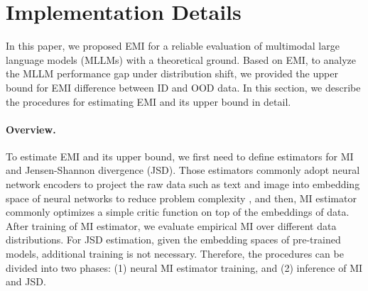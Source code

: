 \section{Implementation Details}\label{appendix:implementation_details}
In this paper, we proposed EMI for a reliable evaluation of multimodal large language models (MLLMs) with a theoretical ground. Based on EMI, to analyze the MLLM performance gap under distribution shift, we provided the upper bound for EMI difference between ID and OOD data. In this section, we describe the procedures for estimating EMI and its upper bound in detail. 

\paragraph{Overview.} To estimate EMI and its upper bound, we first need to define estimators for MI and Jensen-Shannon divergence (JSD). Those estimators commonly adopt neural network encoders to project the raw data such as text and image into embedding space of neural networks to reduce problem complexity \cite{oord2018representation, liu2020learning}, and then, MI estimator commonly optimizes a simple critic function \cite{poole2019variational} on top of the embeddings of data. After training of MI estimator, we evaluate empirical MI over different data distributions. For JSD estimation, given the embedding spaces of pre-trained models, additional training is not necessary. Therefore, the procedures can be divided into two phases: (1) neural MI estimator training, and (2) inference of MI and JSD. 



